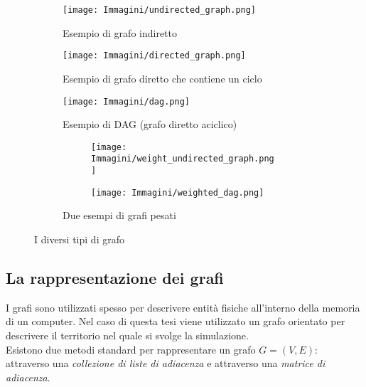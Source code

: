 \begin{figure}[H]
	\centering
	\begin{subfigure}{0.3\textwidth}
		\centering
		\texttt{[image: Immagini/undirected\_graph.png]}
		\caption{Esempio di grafo indiretto}
		\label{fig:udir_graph}
	\end{subfigure}%
\begin{subfigure}{0.3\textwidth}
	\centering
	\texttt{[image: Immagini/directed\_graph.png]}
	\caption{Esempio di grafo diretto che contiene un ciclo}
	\label{fig:dir_graph}
\end{subfigure}%
	\begin{subfigure}{0.4\textwidth}
		\centering
		\texttt{[image: Immagini/dag.png]}
		\caption{Esempio di DAG (grafo diretto aciclico)}
		\label{fig:dag}
	\end{subfigure}
	\begin{subfigure}{1.0\textwidth}
		\centering
		\begin{subfigure}{0.5\textwidth}
			\centering
			\texttt{[image: Immagini/weight\_undirected\_graph.png]}
		\end{subfigure}%
		\begin{subfigure}{0.5\textwidth}
			\centering
			\texttt{[image: Immagini/weighted\_dag.png]}
		\end{subfigure}
		\caption{Due esempi di grafi pesati}
		\label{fig:weighted_graph}
	\end{subfigure}
	\label{fig:graph_flavours}
	\caption{I diversi tipi di grafo}
\end{figure}


\subsection{La rappresentazione dei grafi}\label{subsec:graph_rappr}
I grafi sono utilizzati spesso per descrivere entità fisiche all'interno della memoria di un computer. Nel caso di questa tesi viene utilizzato un grafo orientato per descrivere il territorio nel quale si svolge la simulazione.\\
Esistono due metodi standard per rappresentare un grafo $G = (V, E)$: attraverso una \emph{collezione di liste di adiacenza} e attraverso una \emph{matrice di adiacenza}.

